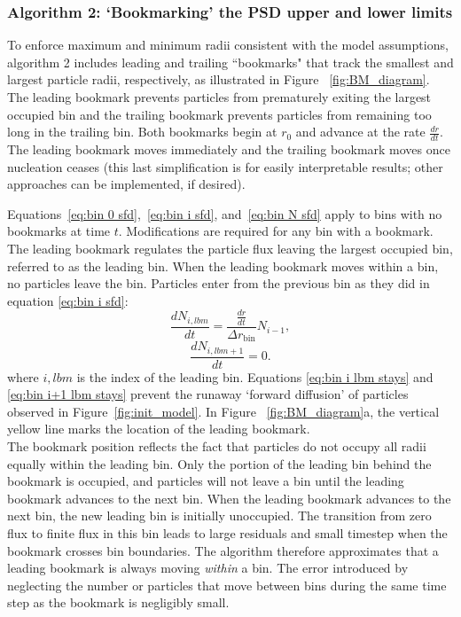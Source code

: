 \documentclass[final,3p,times,twocolumn, 12pt]{elsarticle}
\begin{document}
\subsubsection{Algorithm 2: `Bookmarking' the PSD upper and lower limits}
To enforce maximum and minimum radii consistent with the model assumptions, algorithm 2 includes leading and trailing ``bookmarks" that track the smallest and largest particle radii, respectively, as illustrated in Figure ~\ref{fig:BM_diagram}. The leading bookmark prevents particles from prematurely exiting the largest occupied bin and the trailing bookmark prevents particles from remaining too long in the trailing bin. Both bookmarks begin at $r_0$ and advance at the rate $\frac{dr}{dt}$. The leading bookmark moves immediately and the trailing bookmark moves once nucleation ceases (this last simplification is for easily interpretable results; other approaches can be implemented, if desired). 

Equations~\ref{eq:bin 0 sfd},~\ref{eq:bin i sfd}, and~\ref{eq:bin N sfd} apply to bins with no bookmarks at time $t$. Modifications are required for any bin with a bookmark. The leading bookmark regulates the particle flux leaving the largest occupied bin, referred to as the leading bin. When the leading bookmark moves within a bin, no particles leave the bin. Particles enter from the previous bin as they did in equation \ref{eq:bin i sfd}:
\begin{equation}
    \frac{dN_{i,lbm}}{dt}=\frac{\frac{dr}{dt}}{\Delta r_{\mathrm{bin}}}N_{i-1},
    \label{eq:bin i lbm stays}
\end{equation}
\begin{equation}
    \frac{dN_{i,lbm+1}}{dt}=0.
     \label{eq:bin i+1 lbm stays}
\end{equation}
where $i,lbm$ is the index of the leading bin. Equations \ref{eq:bin i lbm stays} and \ref{eq:bin i+1 lbm stays} prevent the runaway `forward diffusion' of particles observed in Figure~\ref{fig:init_model}. In Figure ~\ref{fig:BM_diagram}a, the vertical yellow line marks the location of the leading bookmark.\\

The bookmark position reflects the fact that particles do not occupy all radii equally within the leading bin. Only the portion of the leading bin behind the bookmark is occupied, and particles will not leave a bin until the leading bookmark advances to the next bin. When the leading bookmark advances to the next bin, the new leading bin is initially unoccupied. The transition from zero flux to finite flux in this bin leads to large residuals and small timestep when the bookmark crosses bin boundaries. The algorithm therefore approximates that a leading bookmark is always moving \emph{within} a bin. The error introduced by neglecting the number or particles that move between bins during the same time step as the bookmark is negligibly small.\\
\end{document}
